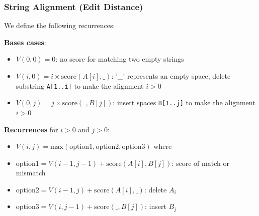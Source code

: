 \documentclass{beamer}
\begin{document}
\begin{frame}[fragile]
\frametitle{String Alignment (Edit Distance)}

We define the following recurrences:

\vspace{0.3cm}
\textbf{Bases cases}:
\begin{itemize}
    \item $V(0,0) = 0$: no score for matching two empty strings
    \pause
    \item $V (i, 0) = i \times \text{score}(A[i], \_)$: '\_' represents an empty space, delete substring \verb|A[1..i]| to make the alignment $i>0$
    \pause    
    \item $V (0,j) = j \times \text{score}(\_, B[j])$: insert spaces \verb|B[1..j]| to make the alignment $i>0$
\end{itemize}

\pause
\vspace{0.3cm}
\textbf{Recurrences} for $i>0$ and $j>0$: 
\pause
\begin{itemize}
    \item $V (i, j) = \text{max}(\text{option1}, \text{option2}, \text{option3})$ where
    \pause
    \item option$1 = V(i-1, j-1) + \text{score}(A[i], B[j])$: score of match or mismatch
    \item option$2= V(i-1,j) + \text{score}(A[i], \_)$: delete $A_i$
    \item option$3= V(i,j-1) + \text{score}(\_, B[j])$: insert $B_j$
\end{itemize}

\end{frame}
\end{document}
